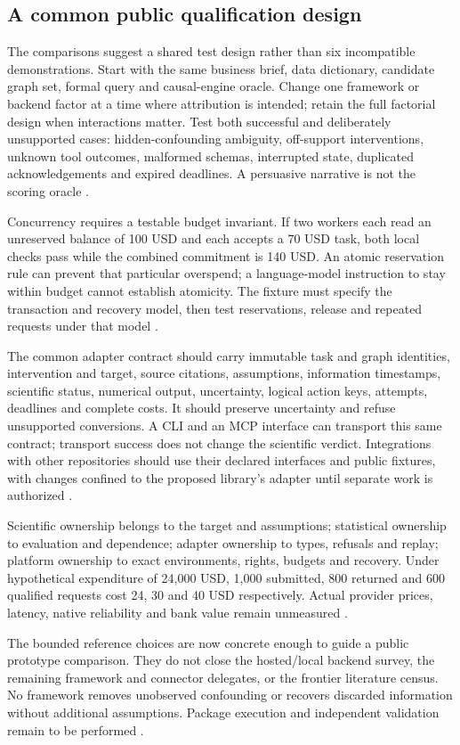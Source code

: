 \subsection{A common public qualification design}
The comparisons suggest a shared test design rather than six incompatible
demonstrations. Start with the same business brief, data dictionary,
candidate graph set, formal query and causal-engine oracle. Change one
framework or backend factor at a time where attribution is intended;
retain the full factorial design when interactions matter. Test both
successful and deliberately unsupported cases: hidden-confounding
ambiguity, off-support interventions, unknown tool outcomes, malformed
schemas, interrupted state, duplicated acknowledgements and expired
deadlines. A persuasive narrative is not the scoring oracle
\citep{exec24_framework_contracts}.

Concurrency requires a testable budget invariant. If two workers each
read an unreserved balance of 100 USD and each accepts a 70 USD task,
both local checks pass while the combined commitment is 140 USD.
An atomic reservation rule can prevent that particular overspend;
a language-model instruction to stay within budget cannot establish
atomicity. The fixture must specify the transaction and recovery model,
then test reservations, release and repeated requests under that model
\citep{exec24_framework_contracts}.

The common adapter contract should carry immutable task and graph
identities, intervention and target, source citations, assumptions,
information timestamps, scientific status, numerical output, uncertainty,
logical action keys, attempts, deadlines and complete costs. It should
preserve uncertainty and refuse unsupported conversions. A CLI and an MCP
interface can transport this same contract; transport success does not
change the scientific verdict. Integrations with other repositories should
use their declared interfaces and public fixtures, with changes confined
to the proposed library's adapter until separate work is authorized
\citep{exec24_framework_contracts}.

Scientific ownership belongs to the target and assumptions; statistical
ownership to evaluation and dependence; adapter ownership to types,
refusals and replay; platform ownership to exact environments, rights,
budgets and recovery. Under hypothetical expenditure of 24,000 USD,
1,000 submitted, 800 returned and 600 qualified requests cost 24, 30 and
40 USD respectively. Actual provider prices, latency, native reliability
and bank value remain unmeasured
\citep{exec24_framework_contracts}.

The bounded reference choices are now concrete enough to guide a public
prototype comparison. They do not close the hosted/local backend survey,
the remaining framework and connector delegates, or the frontier literature
census. No framework removes unobserved confounding or recovers discarded
information without additional assumptions. Package execution and independent validation remain to be performed
\citep{exec24_framework_contracts}.
